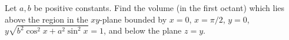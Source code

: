 Let $a, b$ be positive constants. Find the volume (in the first octant) which
lies above the region in the $xy$-plane bounded by $x = 0$, $x = \pi/2$, $y =
0$, $y \sqrt{b^2 \cos^2 x + a^2 \sin^2 x} = 1$, and below the plane $z = y$.
